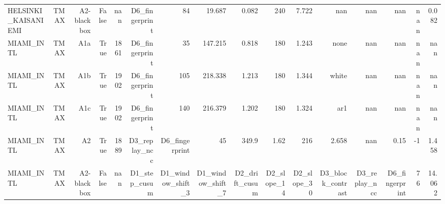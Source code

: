 \documentclass[10pt,a4paper]{article}
\begin{document}
\begin{center}
{\begin{tabular}{lrrrrrrrrrrrrrrr}
HELSINKI\_\allowbreak{}KAISANIEMI & TMAX & A2-\allowbreak{}blackbox & False & nan & D6\_\allowbreak{}fingerprint & 84 & 19.687 & 0.082 & 240 & 7.722 & nan & nan & nan & nan & 0.082 \\
MIAMI\_\allowbreak{}INTL & TMAX & A1a & True & 1861 & D6\_\allowbreak{}fingerprint & 35 & 147.215 & 0.818 & 180 & 1.243 & none & nan & nan & nan & nan \\
MIAMI\_\allowbreak{}INTL & TMAX & A1b & True & 1902 & D6\_\allowbreak{}fingerprint & 105 & 218.338 & 1.213 & 180 & 1.344 & white & nan & nan & nan & nan \\
MIAMI\_\allowbreak{}INTL & TMAX & A1c & True & 1902 & D6\_\allowbreak{}fingerprint & 140 & 216.379 & 1.202 & 180 & 1.324 & ar1 & nan & nan & nan & nan \\
MIAMI\_\allowbreak{}INTL & TMAX & A2 & True & 1889 & D3\_\allowbreak{}replay\_\allowbreak{}ncc & D6\_\allowbreak{}fingerprint & 45 & 349.9 & 1.62 & 216 & 2.658 & nan & 0.15 & -\allowbreak{}1 & 1.458 \\
MIAMI\_\allowbreak{}INTL & TMAX & A2-\allowbreak{}blackbox & False & nan & D1\_\allowbreak{}step\_\allowbreak{}cusum & D1\_\allowbreak{}window\_\allowbreak{}shift\_\allowbreak{}3 & D1\_\allowbreak{}window\_\allowbreak{}shift\_\allowbreak{}7 & D2\_\allowbreak{}drift\_\allowbreak{}cusum & D2\_\allowbreak{}slope\_\allowbreak{}14 & D2\_\allowbreak{}slope\_\allowbreak{}30 & D3\_\allowbreak{}block\_\allowbreak{}contrast & D3\_\allowbreak{}replay\_\allowbreak{}ncc & D6\_\allowbreak{}fingerprint & 76 & 14.062 \\
\bottomrule
\end{tabular}}
\end{center}
\end{document}
